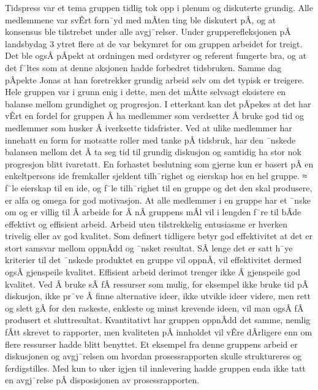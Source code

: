 Tidspress var et tema gruppen tidlig tok opp i plenum og diskuterte grundig.
Alle medlemmene var svÊrt forn¯yd med mÂten ting ble diskutert pÂ, og at konsensus ble tilstrebet under alle avgj¯relser. 
Under grupperefleksjonen pÂ landsbydag 3 ytret flere at de var bekymret for om gruppen arbeidet for treigt.
Det ble ogsÂ pÂpekt at ordningen med ordstyrer og referent fungerte bra, og at det f¯ltes som at denne aksjonen hadde forbedret tidsbruken.
Samme dag pÂpekte Jonas at han foretrekker grundig arbeid selv om det typisk er treigere.
Hele gruppen var i grunn enig i dette, men det mÂtte selvsagt eksistere en balanse mellom grundighet og progresjon.
I etterkant kan det pÂpekes at det har vÊrt en fordel for gruppen Â ha medlemmer som verdsetter Â bruke god tid og medlemmer som husker Â iverksette tidsfrister.
Ved at ulike medlemmer har innehatt en form for motsatte roller med tanke pÂ tidsbruk, har den ¯nskede balansen mellom det Â ta seg tid til grundig diskusjon og samtidig ha stor nok progresjon blitt ivaretatt. 
En forhastet beslutning som gjerne kun er basert pÂ en enkeltpersons ide fremkaller sjeldent tilh¯righet og eierskap hos en hel gruppe.
≈ f¯le eierskap til en ide, og f¯le tilh¯righet til en gruppe og det den skal produsere, er alfa og omega for god motivasjon.
At alle medlemmer i en gruppe har et ¯nske om og er villig til Â arbeide for Â nÂ gruppens mÂl vil i lengden f¯re til bÂde effektivt og effisient arbeid.
Arbeid uten tilstrekkelig entusiasme er hverken trivelig eller av god kvalitet.
Som definert tidligere betyr god effektivitet at det er stort samsvar mellom oppnÂdd og ¯nsket resultat.
SÂ lenge det er satt h¯ye kriterier til det ¯nskede produktet en gruppe vil oppnÂ, vil effektivitet dermed ogsÂ gjenspeile kvalitet.
Effisient arbeid derimot trenger ikke Â gjenspeile god kvalitet.
Ved Â bruke sÂ fÂ ressurser som mulig, for eksempel ikke bruke tid pÂ diskusjon, ikke pr¯ve Â finne alternative ideer, ikke utvikle ideer videre, men rett og slett gÂ for den raskeste, enkleste og minst krevende ideen, vil man ogsÂ fÂ produsert et sluttresultat.
Kvantitativt har gruppen oppnÂdd det samme, nemlig fÂtt skrevet to rapporter, men kvaliteten pÂ innholdet vil vÊre dÂrligere enn om flere ressurser hadde blitt benyttet.
Et eksempel fra denne gruppens arbeid er diskusjonen og avgj¯relsen om hvordan prosessrapporten skulle struktureres og ferdigstilles.
Med kun to uker igjen til innlevering hadde gruppen enda ikke tatt en avgj¯relse pÂ disposisjonen av prosessrapporten.
